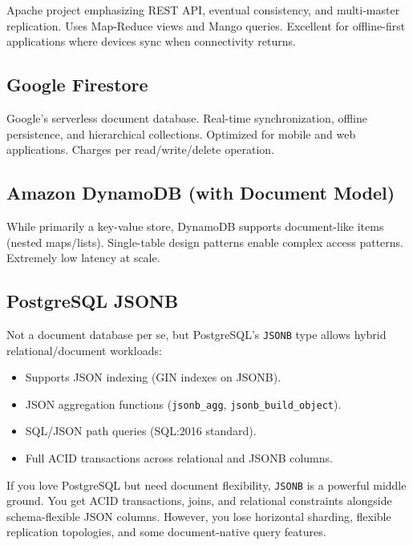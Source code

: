 \documentclass[12pt,a4paper]{article}
\begin{document}
Apache project emphasizing REST API, eventual consistency, and multi-master replication. Uses Map-Reduce views and Mango queries. Excellent for offline-first applications where devices sync when connectivity returns.

\subsection{Google Firestore}

Google's serverless document database. Real-time synchronization, offline persistence, and hierarchical collections. Optimized for mobile and web applications. Charges per read/write/delete operation.

\subsection{Amazon DynamoDB (with Document Model)}

While primarily a key-value store, DynamoDB supports document-like items (nested maps/lists). Single-table design patterns enable complex access patterns. Extremely low latency at scale.

\subsection{PostgreSQL JSONB}

Not a document database per se, but PostgreSQL's \texttt{JSONB} type allows hybrid relational/document workloads:
\begin{itemize}[noitemsep]
    \item Supports JSON indexing (GIN indexes on JSONB).
    \item JSON aggregation functions (\texttt{jsonb\_agg}, \texttt{jsonb\_build\_object}).
    \item SQL/JSON path queries (SQL:2016 standard).
    \item Full ACID transactions across relational and JSONB columns.
\end{itemize}

\begin{rdbmsnote}
If you love PostgreSQL but need document flexibility, \texttt{JSONB} is a powerful middle ground. You get ACID transactions, joins, and relational constraints alongside schema-flexible JSON columns. However, you lose horizontal sharding, flexible replication topologies, and some document-native query features.
\end{rdbmsnote}
\end{document}
